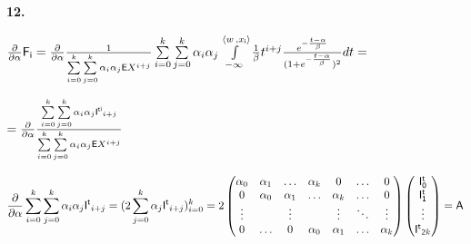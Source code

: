 \documentclass[a4paper,12pt]{article}
\begin{document}
\noindent\textbf{12.}

\begin{center}
    ${\partial\over{\partial \alpha}} \mathsf{F_i} = {\partial\over{\partial \alpha}} {1\over{\sum\limits_{i = 0}^k}\sum\limits_{j=0}^k\alpha_i \alpha_j \mathsf{E}X^{i + j}} \sum\limits_{i = 0}^k \sum\limits_{j = 0}^k \alpha_i \alpha_j \int\limits_{-\infty}^{\langle w \,, x_{\mathsf{i}}\rangle} {1\over{\beta}} t^{i + j} {e^{-{t - \alpha\over{\beta}}}\over{(1 + e^{-{t - \alpha\over{\beta}}}})^2} d t = $
\end{center}

\begin{center}
    $= {\partial\over{\partial \alpha}} {\sum\limits_{i = 0}^k \sum\limits_{j = 0}^k \alpha_i \alpha_j \mathsf{I^{ti}}_{i + j}\over{\sum\limits_{i = 0}^k}\sum\limits_{j=0}^k\alpha_i \alpha_j \mathsf{E}X^{i + j}} $
\end{center}

\begin{displaymath}
    {\partial\over{\partial \alpha}} \sum\limits_{i = 0}^k \sum\limits_{j = 0}^k \alpha_i \alpha_j \mathsf{I^{t}}_{i + j} = (2 \sum\limits_{j = 0}^k \alpha_j \mathsf{I^{t}}_{i + j})_{i = 0}^k
    = 2\begin{pmatrix}
        \alpha_0 & \alpha_1 & \ldots & \alpha_k & 0 & \ldots & 0 \\
        0 & \alpha_0 & \alpha_1 & \ldots & \alpha_k & \ldots & 0 \\
        \vdots &  & \vdots &  & \vdots & \ddots & \vdots\\
        0 & \ldots & 0 & \alpha_0 & \alpha_1 &\ldots & \alpha_k \\
    \end{pmatrix} \begin{pmatrix}
        \mathsf{I^t_0} \\ \mathsf{I^t_1} \\ \vdots \\ \mathsf{I^t}_{\mathsf{2}k} \\
    \end{pmatrix} = \mathsf{A}
\end{displaymath}
\end{document}
